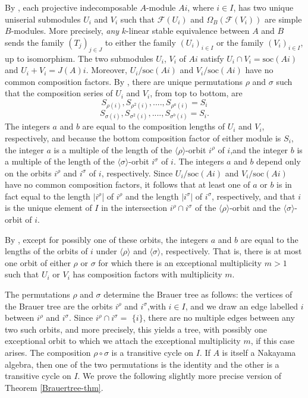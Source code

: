 \documentclass{amsart}
\theoremstyle{plain}\newtheorem{Theorem}{Theorem}[section]
\theoremstyle{plain}\newtheorem{Conjecture}[Theorem]{Conjecture}
\theoremstyle{plain}\newtheorem{Corollary}[Theorem]{Corollary}
\theoremstyle{plain}\newtheorem{Lemma}[Theorem]{Lemma}
\theoremstyle{plain}\newtheorem{Proposition}[Theorem]{Proposition}
\theoremstyle{definition}\newtheorem{Definition}[Theorem]{Definition}
\theoremstyle{definition}\newtheorem{Example}[Theorem]{Example}
\theoremstyle{definition}\newtheorem{Examples}[Theorem]{Examples}
\theoremstyle{definition}\newtheorem{Exercise}[Theorem]{Exercise}
\theoremstyle{definition}\newtheorem{Notation}[Theorem]{Notation}
\theoremstyle{definition}\newtheorem{Remark}[Theorem]{Remark}
\theoremstyle{definition}\newtheorem{Remarks}[Theorem]{Remarks}
\theoremstyle{plain}\newtheorem{Statement}[Theorem]{}
\def\CF{{\mathcal{F}}}  \def\OS{{\mathcal{O}S}}
\def\soc{\mathrm{soc}}           \def\tenOS{\otimes_{\mathcal{O}S}}
\begin{document}
\medskip
By \cite[Theorem 11.6.3]{LiBookII}, each projective indecomposable $A$-module
$Ai$, where $i\in I$, has two unique uniserial submodules $U_i$ and $V_i$ such that
$\CF(U_i)$ and $\Omega_B(\CF(V_i))$ are simple $B$-modules. More precisely,
{\em any} $k$-linear stable equivalence between $A$ and $B$ sends the family 
$(T_j)_{j\in J}$ to either the family $(U_i)_{i\in I}$ or the family $(V_i)_{i\in I}$, 
up to isomorphism. The two submodules $U_i$, $V_i$ of $Ai$ satisfy 
$U_i\cap V_i=\soc(Ai)$ and $U_i+V_i=J(A)i$.
Moreover, $U_i/\soc(Ai)$ and $V_i/\soc(Ai)$ have no common composition factors.
By \cite[Theorem 11.6.4]{LiBookII}, there are unique permutations $\rho$ and $\sigma$
such that the composition series of $U_i$ and $V_i$,  from top to bottom, are
$$S_{\rho(i)}, S_{\rho^2(i)},...., S_{\rho^a(i)}=S_i$$
$$S_{\sigma(i)}, S_{\sigma^2(i)},...., S_{\sigma^b(i)}=S_i . $$
The integers $a$ and $b$ are equal to the composition lengths of $U_i$ and $V_i$,
respectively, and because the bottom composition factor of either module
is $S_i$, the integer $a$ is a multiple of the length of the 
$\langle\rho\rangle$-orbit $i^\rho$ of $i$,and the integer $b$ is a multiple of the 
length of the $\langle\sigma\rangle$-orbit $i^\sigma$ of $i$. 
The integers $a$ and $b$ depend only on the orbits $i^\rho$ and $i^\sigma$ of $i$,
respectively. Since $U_i/\soc(Ai)$ and $V_i/\soc(Ai)$ have no common
composition factors, it follows that at least one of $a$ or $b$ is in fact equal to
the length $|i^\rho$| of $i^\rho$  and the length $|i^\sigma|$ of $i^\sigma$,
respectively, and that $i$ is
the unique element of $I$ in the intersection $i^\rho\cap i^\sigma$
of the $\langle\rho\rangle$-orbit and the
$\langle\sigma\rangle$-orbit of $i$. 

\medskip
By \cite[Theorem 11.7.2]{LiBookII}, except for possibly one of these orbits,
the integers $a$ and $b$ are equal to the lengths of the orbits of $i$ under
$\langle\rho\rangle$ and $\langle\sigma\rangle$, respectively. 
That is, there is at most one orbit of either
$\rho$ or $\sigma$ for which there is an exceptional multiplicity $m>1$
such that $U_i$ or $V_i$ has composition factors with multiplicity $m$.

\medskip
The permutations $\rho$ and $\sigma$ determine the Brauer tree as follows:
the vertices of the Brauer tree are the orbits $i^\rho$ and $i^\sigma$,with $i\in I$,
and we draw an edge labelled $i$
between $i^\rho$ and $i^\sigma$. Since $i^\rho\cap i^\sigma=$ $\{i\}$, there are
no multiple edges between any two such orbits, and more precisely, this yields a tree,
with possibly one exceptional orbit to which we attach the exceptional multiplicity
$m$,  if this case arises.  The composition $\rho\circ\sigma$ is a transitive cycle on $I$.
If $A$ is itself a Nakayama algebra, then one of the two 
permutations is the identity and the other is a transitive cycle on $I$.
We prove the following slightly more precise version of
Theorem \ref{Brauertree-thm}.
\end{document}
